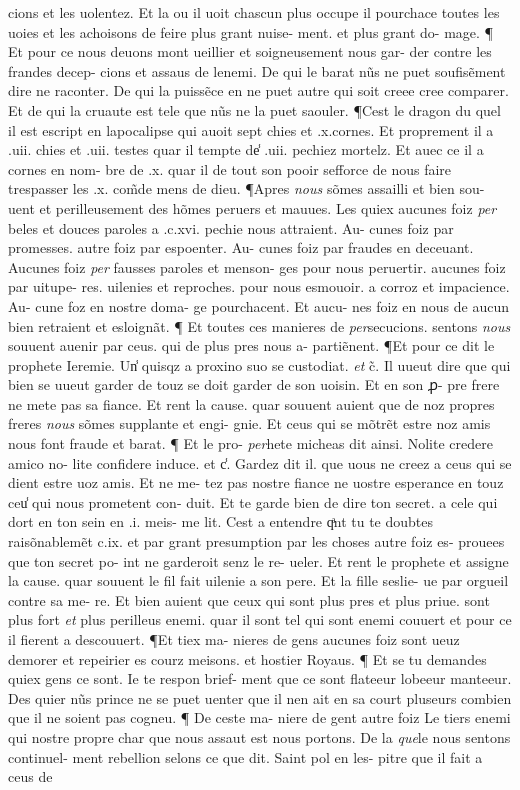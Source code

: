 \documentclass{article}
\begin{document}
\begin{pages}
cions et les uolentez. Et la ou il uoit chascun plus occupe il pourchace toutes les uoies et les achoisons de feire plus grant nuise- ment. et plus grant do- mage. ¶ Et pour ce nous deuons mont ueillier et soigneusement nous gar- der contre les frandes decep- cions et assaus de lenemi. De qui le barat nũs ne puet soufisẽment dire ne raconter. De qui la puissẽce en ne puet autre qui soit creee cree comparer. Et de qui la cruaute est tele que nũs ne la puet saouler. ¶Cest le dragon du quel il est escript en lapocalipse qui auoit sept chies et .x.cornes. Et proprement il a .uii. chies et .uii. testes quar il tempte de̾ .uii. pechiez mortelz. Et auec ce il a cornes en nom- bre de .x. quar il de tout son pooir sefforce de nous faire trespasser les .x. com̃de mens de dieu. ¶Apres \textit{nous} sõmes assailli et bien sou- uent et perilleusement des hõmes peruers et mauues. Les quiex aucunes foiz \textit{per} beles et douces paroles a .c.xvi. pechie nous attraient. Au- cunes foiz par promesses. autre foiz par espoenter. Au- cunes foiz par fraudes en deceuant. Aucunes foiz \textit{per} fausses paroles et menson- ges pour nous peruertir. aucunes foiz par uitupe- res. uilenies et reproches. pour nous esmouoir. a corroz et impacience. Au- cune foz en nostre doma- ge pourchacent. Et aucu- nes foiz en nous de aucun bien retraient et esloignãt. ¶ Et toutes ces manieres de \textit{per}secucions. sentons \textit{nous} souuent auenir par ceus. qui de plus pres nous a- partiẽnent. ¶Et pour ce dit le prophete Ieremie. Un̾ quisqz a proxino suo se custodiat. \textit{et} c̃. Il uueut dire que qui bien se uueut garder de touz se doit garder de son uoisin. Et en son ꝓ- pre frere ne mete pas sa fiance. Et rent la cause. quar souuent auient que de noz propres freres \textit{nous} sõmes supplante et engi- gnie. Et ceus qui se mõtrẽt estre noz amis nous font fraude et barat. ¶ Et le pro- \textit{per}hete micheas dit ainsi. Nolite credere amico no- lite confidere induce. et c̾. Gardez dit il. que uous ne creez a ceus qui se dient estre uoz amis. Et ne me- tez pas nostre fiance ne uostre esperance en touz ceu̾ qui nous prometent con- duit. Et te garde bien de dire ton secret. a cele qui dort en ton sein en .i. meis- me lit. Cest a entendre qͣnt tu te doubtes raisõnablemẽt c.ix. et par grant presumption par les choses autre foiz es- prouees que ton secret po- int ne garderoit senz le re- ueler. Et rent le prophete et assigne la cause. quar souuent le fil fait uilenie a son pere. Et la fille seslie- ue par orgueil contre sa me- re. Et bien auient que ceux qui sont plus pres et plus priue. sont plus fort \textit{et} plus perilleus enemi. quar il sont tel qui sont enemi couuert et pour ce il fierent a descouuert. ¶Et tiex ma- nieres de gens aucunes foiz sont ueuz demorer et repeirier es courz meisons. et hostier Royaus. ¶ Et se tu demandes quiex gens ce sont. Ie te respon brief- ment que ce sont flateeur lobeeur manteeur. Des quier nũs prince ne se puet uenter que il nen ait en sa court pluseurs combien que il ne soient pas cogneu. ¶ De ceste ma- niere de gent autre foiz Le tiers enemi qui nostre propre char que nous assaut est nous portons. De la \textit{que}le nous sentons continuel- ment rebellion selons ce que dit. Saint pol en les- pitre que il fait a ceus de 
\end{pages}
\end{document}
